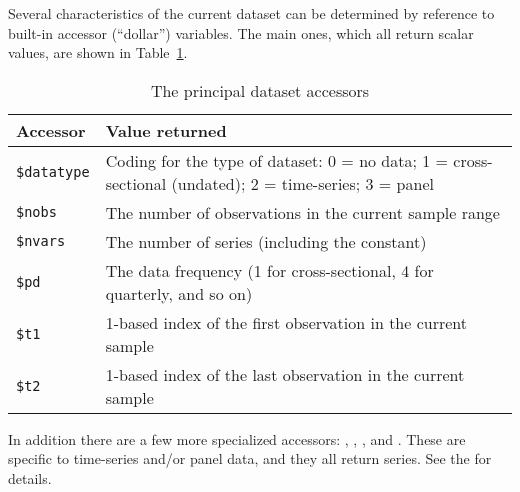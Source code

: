 Several characteristics of the current dataset can be determined by
reference to built-in accessor (``dollar'') variables. The main ones,
which all return scalar values, are shown in
Table~\ref{tab:dataset-accessors}.

\begin{table}[htbp]
  \centering
  \begin{tabular}{lp{}}
    \textbf{Accessor} & \textbf{Value returned} \\ \hline
    \verb|$datatype| & Coding for the type of dataset: 
    0 = no data; 1 = cross-sectional (undated); 2 = time-series;
    3 = panel \\
    \verb|$nobs| & The number of observations in the current 
    sample range \\
    \verb|$nvars| & The number of series (including the constant)\\
    \verb|$pd| & The data frequency (1 for cross-sectional, 4 for
    quarterly, and so on) \\
    \verb|$t1| & 1-based index of the first observation in the
    current sample \\
    \verb|$t2| & 1-based index of the last observation in the
    current sample \\
    \hline
  \end{tabular}
  \caption{The principal dataset accessors}
  \label{tab:dataset-accessors}
\end{table}

In addition there are a few more specialized accessors:
, , ,
 and . These are specific to time-series
and/or panel data, and they all return series. See the \GCR{} for
details. 



